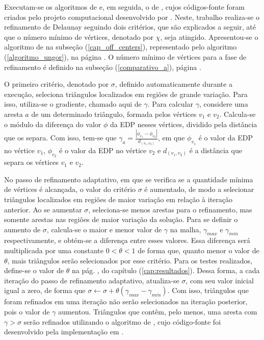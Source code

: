 Executam-se os algoritmos de  e, em seguida, o de , cujos códigos-fonte foram criados pelo projeto computacional desenvolvido por . Neste, trabalho realiza-se o refinamento de Delaunay seguindo dois critérios, que são explicados a seguir, até que o número mínimo de vértices, denotado por $\chi$, seja atingido. Apresentou-se o algoritmo de  na subseção (\ref{cap_off_centers}), representado pelo algoritmo (\ref{algoritmo_ungor}), na página \pageref{algoritmo_ungor}. O número mínimo de vértices para a fase de refinamento é definido na subseção (\ref{comparativo_a}), página \pageref{comparativo_a}.

O primeiro critério, denotado por $\sigma$, definido automaticamente durante a execução, seleciona triângulos localizados em regiões de grande variação. Para isso, utiliza-se o gradiente, chamado aqui de $\gamma$. Para calcular $\gamma$, considere uma aresta $a$ de um determinado triângulo, formada pelos vértices $v_1$ e $v_2$. Calcula-se o módulo da diferença do valor $\phi$ da EDP nesses vértices, dividido pela distância que os separa. Com isso, tem-se que $\gamma_{a} = \frac{ | \phi_{v_1} - \phi_{v_2} | }{d_{( v_{1},v_{2} )}}$, em que $\phi_{v_1}$ é o valor da EDP no vértice $v_1$, $\phi_{v_2}$ é o valor da EDP no vértice $v_2$ e $d_{( v_{1},v_{2} )}$ é a distância que separa os vértices $v_1$ e $v_2$. 

No passo de refinamento adaptativo, em que se verifica se a quantidade mínima de vértices é alcançada, o valor do critério $\sigma$ é aumentado, de modo a selecionar triângulos localizados em regiões de maior variação em relação à iteração anterior. Ao se aumentar $\sigma$, seleciona-se menos arestas para o refinamento, mas somente arestas nas regiões de maior variação da solução. Para se definir o aumento de $\sigma$, calcula-se o maior e menor valor de $\gamma$ na malha, $\gamma_{max}$ e $\gamma_{min}$ respectivamente, e obtém-se a diferença entre esses valores. Essa diferença será multiplicada por uma constante $0 < \theta < 1$ de forma que, quanto menor o valor de $\theta$, mais triângulos serão selecionados por esse critério. Para os testes realizados, define-se o valor de $\theta$ na pág. \pageref{cap:resultados}, do capítulo (\ref{cap:resultados}). Dessa forma, a cada iteração do passo de refinamento adaptativo, atualiza-se $\sigma$, com seu valor inicial igual a zero, de forma que $\sigma \leftarrow \sigma + \theta( \gamma_{max} - \gamma_{min})$. Com isso, triângulos que foram refinados em uma iteração não serão selecionados na iteração posterior, pois o valor de $\gamma$ aumentou. Triângulos que contêm, pelo menos, uma aresta com $\gamma > \sigma$ serão refinados utilizando o algoritmo de , cujo código-fonte foi desenvolvido pela implementação em . 

